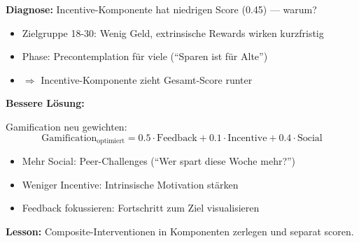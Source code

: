 \begin{tcolorbox}[colback=red!3!white, colframe=red!60!black,
    title=\textbf{Case Study 4: Die Bank und die fehlende ``Gamification''}]
\textbf{Diagnose:} Incentive-Komponente hat niedrigen Score (0.45) --- warum?
\begin{itemize}[nosep]
    \item Zielgruppe 18-30: Wenig Geld, extrinsische Rewards wirken kurzfristig
    \item Phase: Precontemplation für viele (``Sparen ist für Alte'')
    \item $\Rightarrow$ Incentive-Komponente zieht Gesamt-Score runter
\end{itemize}

\textbf{Bessere Lösung:}

Gamification neu gewichten:
\begin{equation*}
\text{Gamification}_{\text{optimiert}} = 0.5 \cdot \text{Feedback} + 0.1 \cdot \text{Incentive} + 0.4 \cdot \text{Social}
\end{equation*}

\begin{itemize}[nosep]
    \item Mehr Social: Peer-Challenges (``Wer spart diese Woche mehr?'')
    \item Weniger Incentive: Intrinsische Motivation stärken
    \item Feedback fokussieren: Fortschritt zum Ziel visualisieren
\end{itemize}

\textbf{Lesson:} \colorbox{yellow!30}{Composite-Interventionen in Komponenten zerlegen und separat scoren.}

\end{tcolorbox}


